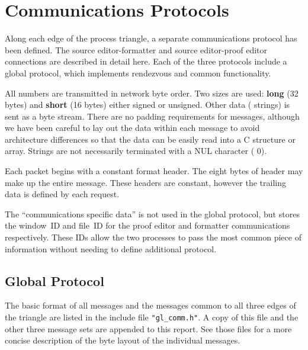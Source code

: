 \section{Communications Protocols}

Along each edge of the process triangle, a separate communications
protocol has been defined.  The source editor-formatter and
source editor-proof editor connections are described in detail here.
Each of the three protocols include a global protocol, which
implements rendezvous and common functionality.

All numbers are transmitted in network byte order.  Two sizes are
used: {\bf long} (32 bytes) and {\bf short} (16 bytes) either signed
or unsigned.  Other data ({\ASCII} strings) is sent as a byte stream.
There are no padding requirements for messages, although we have been
careful to lay out the data within each message to avoid architecture
differences so that the data can be easily read into a C structure or
array.  Strings are not necessarily terminated with a NUL character
({\ASCII} 0).

Each packet begins with a constant format header.  The eight bytes of
header may make up the entire message.  These headers are constant,
however the trailing data is defined by each request.


The ``communications specific data'' is not used in the global
protocol, but stores the window~ID and file~ID for the proof editor
and formatter communications respectively.  These IDs allow the two
processes to pass the most common piece of information without
needing to define additional protocol.

\subsection{Global Protocol}

The basic format of all messages and the messages common to all three
edges of the triangle are listed in the include file {\tt "gl\_comm.h"}.
A copy of this file and the other three message sets are appended to
this report.  See those files for a more concise description of
the byte layout of the individual messages.

